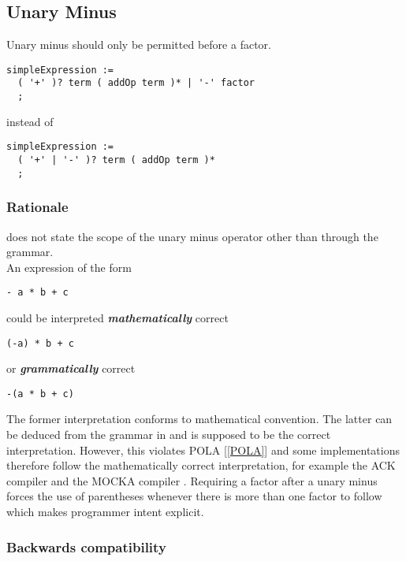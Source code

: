 \documentclass[10pt,a4paper]{article}
\renewcommand{\emph}[1]{\textbf{\textit{#1}}}
\begin{document}
\subsection{Unary Minus}

Unary minus should only be permitted before a factor.

\begin{verbatim}
simpleExpression :=
  ( '+' )? term ( addOp term )* | '-' factor
  ;
\end{verbatim}

\noindent instead of

\begin{verbatim}
simpleExpression :=
  ( '+' | '-' )? term ( addOp term )*
  ;
\end{verbatim}

\subsubsection{Rationale}

\cite{Wirth88} does not state the scope of the unary minus operator other than
through the grammar.\\

\noindent An expression of the form

\begin{verbatim}
- a * b + c
\end{verbatim}

\noindent could be interpreted \emph{mathematically} correct
\begin{verbatim}
(-a) * b + c
\end{verbatim}

\noindent or \emph{grammatically} correct
\begin{verbatim}
-(a * b + c)
\end{verbatim}

The former interpretation conforms to mathematical convention. The latter can
be deduced from the grammar in \cite{Wirth88} and is supposed to be the correct
interpretation. However, this violates POLA [\ref{POLA}] and some
implementations therefore follow the mathematically correct interpretation,
for example the ACK compiler \cite{ACK} and the MOCKA compiler \cite{MOCKA}.
Requiring a factor after a unary minus forces the use of parentheses whenever
there is more than one factor to follow which makes programmer intent explicit.

\subsubsection{Backwards compatibility}
\end{document}
